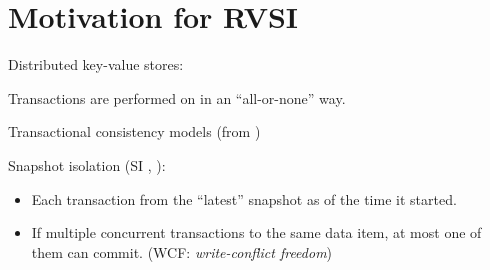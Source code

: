 \section{Motivation for RVSI}

\begin{frame}{}
  \centerline{Distributed key-value stores:}
  \centerline{\putop{} \qquad \getop{}}
\end{frame}

\begin{frame}{}
  \begin{center}
    Transactions are performed on  in an ``all-or-none'' way.
  \end{center}

  \vspace{0.50cm}
  \centerline{Transactional consistency models (from )}
\end{frame}

\begin{frame}{}
  Snapshot isolation (SI , ):
  \begin{itemize}
    \item Each transaction  from the ``latest'' snapshot as of the time it started.
    \item If multiple concurrent transactions  to the same data item,
      at most one of them can commit. \hfill (WCF: \emph{write-conflict freedom})
  \end{itemize}
\end{frame}

